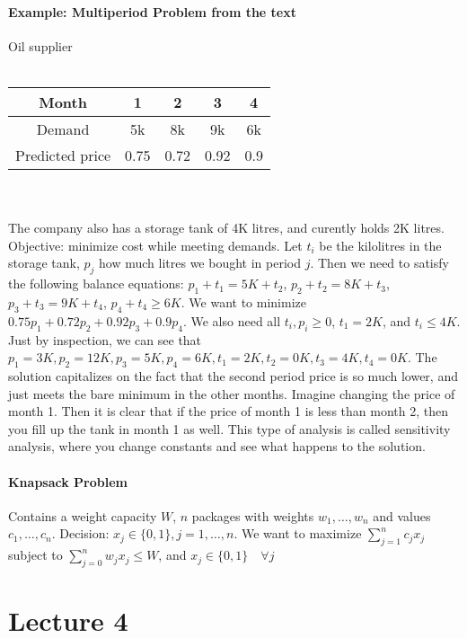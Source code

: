 \documentclass[10pt,letter]{article}
\theoremstyle{plain}
\theoremstyle{definition}
\begin{document}
\paragraph{Example: Multiperiod Problem from the text}
Oil supplier\\\\
\begin{tabular}{|c|cccc|}
\hline
Month & 1&2&3&4 \\ \hline
Demand &5k&8k&9k&6k    \\
Predicted price & 0.75&0.72&0.92&0.9\\ \hline
\end{tabular}\\ \\
The company also has a storage tank of 4K litres, and curently holds 2K litres. Objective: minimize cost while meeting demands. Let $t_i$ be the kilolitres in the storage tank, $p_j$ how much litres we bought in period $j$. Then we need to satisfy the following balance equations: $p_1+t_1=5K+t_2$, $p_2+t_2=8K+t_3$, $p_3+t_3=9K+t_4$, $p_4+t_4\geq6K$. We want to minimize $0.75p_1+0.72p_2+0.92p_3+0.9p_4$. We also need all $t_i,p_i\geq0$, $t_1=2K$, and $t_i\leq4K$. Just by inspection, we can see that $p_1=3K,p_2=12K,p_3=5K,p_4=6K, t_1=2K,t_2=0K,t_3=4K,t_4=0K$. The solution capitalizes on the fact that the second period price is so much lower, and just meets the bare minimum in the other months. Imagine changing the price of month 1. Then it is clear that if the price of month 1 is less than month 2, then you fill up the tank in month 1 as well. This type of analysis is called sensitivity analysis, where you change constants and see what happens to the solution.

\paragraph{Knapsack Problem}
Contains a weight capacity $W$, $n$ packages with weights $w_1,\ldots, w_n$ and values $c_1,\ldots,c_n$. Decision: $x_j\in\{0,1\}, j=1,\ldots,n$. We want to maximize $\sum_{j=1}^nc_jx_j$ subject to $\sum_{j=0}^nw_jx_j\leq W$, and $x_j\in\{0,1\}\quad\forall j$






\section*{Lecture 4}
\end{document}
